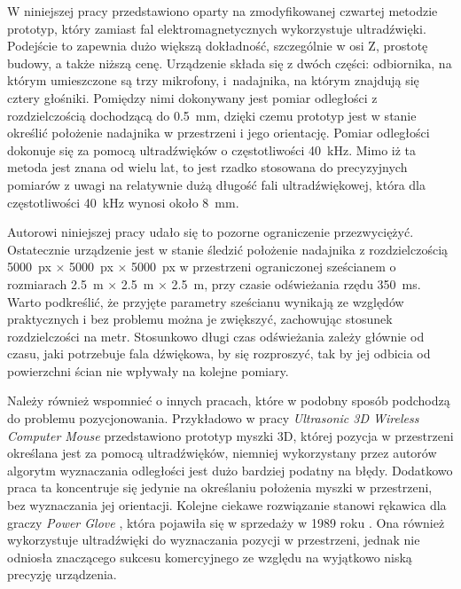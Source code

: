  W niniejszej pracy przedstawiono oparty na zmodyfikowanej czwartej metodzie prototyp, który zamiast 
 fal elektromagnetycznych wykorzystuje ultradźwięki. 
 Podejście to zapewnia dużo większą dokładność, szczególnie w osi Z, prostotę budowy, a także niższą cenę.
 Urządzenie składa się z dwóch części: odbiornika, na którym umieszczone są trzy mikrofony, i~nadajnika,
 na którym znajdują się cztery głośniki. Pomiędzy nimi dokonywany jest pomiar odległości z rozdzielczością
 dochodzącą do \SI{0,5}{mm}, dzięki czemu prototyp jest w stanie określić położenie nadajnika
w przestrzeni i jego orientację. 
Pomiar odległości dokonuje się za pomocą ultradźwięków o częstotliwości \SI{40}{kHz}.
Mimo iż ta metoda jest znana od wielu lat, to jest  rzadko stosowana do precyzyjnych pomiarów
z uwagi na relatywnie dużą długość fali ultradźwiękowej,
która dla częstotliwości \SI{40}{kHz} wynosi około \SI{8}{mm}.

Autorowi niniejszej pracy udało się to pozorne ograniczenie przezwyciężyć.
Ostatecznie urządzenie jest w stanie śledzić położenie nadajnika z rozdzielczością 
\SI{5000}{px} $\times$ \SI{5000}{px} $\times$ \SI{5000}{px} w przestrzeni ograniczonej sześcianem o rozmiarach 
\SI{2,5}{m} $\times$ \SI{2,5}{m}  $\times$ \SI{2,5}{m}, przy czasie odświeżania rzędu \SI{350}{ms}.
Warto podkreślić, że przyjęte parametry sześcianu wynikają ze względów praktycznych i bez 
problemu można je zwiększyć, zachowując stosunek rozdzielczości na metr.
Stosunkowo długi czas odświeżania zależy głównie od czasu,  
 jaki potrzebuje fala dźwiękowa, by się rozproszyć,
 tak by jej odbicia od powierzchni ścian nie wpływały na kolejne pomiary.

Należy również wspomnieć o innych pracach, które w podobny sposób podchodzą do problemu pozycjonowania. Przykładowo 
w pracy \textit{Ultrasonic 3D Wireless Computer Mouse} \cite{bib:mouse} przedstawiono prototyp myszki 3D, której
pozycja w przestrzeni określana jest za pomocą ultradźwięków, niemniej wykorzystany przez autorów algorytm wyznaczania 
odległości jest dużo bardziej podatny na błędy. Dodatkowo praca ta koncentruje się jedynie
na określaniu położenia myszki w przestrzeni, bez wyznaczania jej orientacji.
Kolejne ciekawe rozwiązanie stanowi rękawica dla graczy 
\textit{Power Glove} \cite{bib:powerGlove}, która pojawiła się w sprzedaży w  1989 roku \cite{bib:powerGlove2}. 
Ona również wykorzystuje ultradźwięki do wyznaczania pozycji
w przestrzeni, jednak nie odniosła  znaczącego sukcesu komercyjnego ze względu na wyjątkowo niską precyzję urządzenia.


